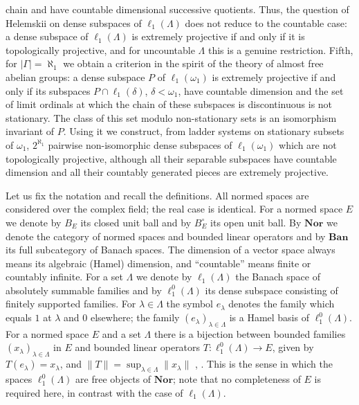 \documentclass[12pt]{article}
\newcommand{\Nor}{\mathbf{Nor}}
\newcommand{\Ban}{\mathbf{Ban}}
\newcommand{\lo}[1]{\ell_1^0(#1)}
\newcommand{\ellone}[1]{\ell_1(#1)}
\newcommand{\norm}[1]{\lVert #1\rVert}
\begin{document}
chain and have countable dimensional successive quotients. Thus, the
question of Helemskii on dense subspaces of
$\ellone{\Lambda}$ does not reduce to the countable case: a dense subspace of
$\ellone{\Lambda}$ is extremely projective if and only if it is topologically
projective, and for uncountable $\Lambda$ this is a genuine restriction.
Fifth, for $|\Gamma|=\aleph_1$ we obtain a criterion in the spirit of the
theory of almost free abelian groups: a dense subspace $P$ of
$\ellone{\omega_1}$ is extremely projective if and only if its subspaces
$P\cap\ellone{\delta}$, $\delta<\omega_1$, have countable dimension and the
set of limit ordinals at which the chain of these subspaces is discontinuous
is not stationary. The class of this set modulo non-stationary sets is an
isomorphism invariant of $P$. Using it we construct, from ladder systems on
stationary subsets of $\omega_1$, $2^{\aleph_1}$ pairwise non-isomorphic
dense subspaces of $\ellone{\omega_1}$ which are not topologically
projective, although all their separable subspaces have countable dimension
and all their countably generated pieces are extremely projective.

Let us fix the notation and recall the definitions. All normed spaces are
considered over the complex field; the real case is identical. For a normed
space $E$ we denote by $B_E$ its closed unit ball and by $B_E^\circ$ its open
unit ball. By $\Nor$ we denote the category of normed spaces and bounded linear
operators and by $\Ban$ its full subcategory of Banach spaces. The dimension
of a vector space always means its algebraic (Hamel) dimension, and
``countable'' means finite or countably infinite. For a set
$\Lambda$ we denote by $\ellone{\Lambda}$ the Banach space of absolutely
summable families and by $\lo{\Lambda}$ its dense subspace consisting of finitely
supported families. For $\lambda\in\Lambda$ the symbol $e_\lambda$ denotes the
family which equals $1$ at $\lambda$ and $0$ elsewhere; the family
${(e_\lambda)}_{\lambda\in\Lambda}$ is a Hamel basis of $\lo{\Lambda}$. For a
normed space $E$ and a set $\Lambda$ there is a bijection between bounded
families ${(x_\lambda)}_{\lambda\in\Lambda}$ in $E$ and bounded linear
operators $T:\lo{\Lambda}\to E$, given by $T(e_\lambda)=x_\lambda$, and
$\norm{T}=\sup_{\lambda\in\Lambda}\norm{x_\lambda}$
\cite[proposition 2.1]{HelExtrProjSeqAlg}, \cite[proposition 1.10]{GronLiftProbNormSp}.
This is the sense in which the spaces $\lo{\Lambda}$ are free objects of
$\Nor$; note that no completeness of $E$ is required here, in contrast with
the case of $\ellone{\Lambda}$.
\end{document}
